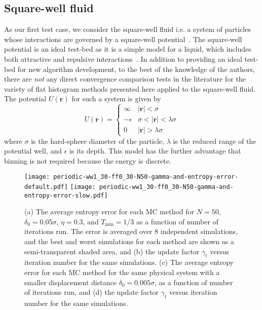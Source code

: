 \documentclass[letterpaper,twocolumn,amsmath,amssymb,pre,aps,10pt]{revtex4-1}
\begin{document}
\subsection{Square-well fluid}
As our first test case, we consider the square-well fluid i.e. a
system of particles whose interactions are governed by a square-well
potential~\cite{singh2003surface, barker2004perturbationSW}.  The
square-well potential is an ideal test-bed as it is a simple model for
a liquid, which includes both attractive and repulsive
interactions~\cite{barker1967-SW-perturbation, vega1992phase}.
In addition to providing an ideal test-bed for new algorithm development,
to the best of the knowledge of the authors, there are \emph{not} any direct convergence comparison tests in the literature for the variety of flat histogram methods presented here applied to the square-well fluid.
The
potential $U(\textbf{r})$ for such a system is given by
\begin{equation}
 U(\textbf{r})=\begin{cases} \infty &
 \lvert\textbf{r}\rvert< \sigma\\-\epsilon &
 \sigma<\lvert\textbf{r}\rvert<\lambda\sigma\\0 &
 \lvert\textbf{r}\rvert > \lambda\sigma\end{cases}
\end{equation}
where $\sigma$ is the hard-sphere diameter of the particle, $\lambda$ is the
reduced range of the potential well, and $\epsilon$ is its depth. This model has
the further advantage that binning is not required because the energy is
discrete.

\begin{figure*}
  \texttt{[image: periodic-ww1\_30-ff0\_30-N50-gamma-and-entropy-error-default.pdf]}%
\texttt{[image: periodic-ww1\_30-ff0\_30-N50-gamma-and-entropy-error-slow.pdf]}
  \caption{(a) The average entropy error for each MC method for $N=50$,
               $\delta_0 = 0.05\sigma$, $\eta = 0.3$, and $T_{\min} = 1/3$
               as a function of number of iterations run. The error is
               averaged over 8 independent simulations, and the best
               and worst simulations for each method are shown as a
               semi-transparent shaded area, and
           (b) the update factor $\gamma_t$ versus iteration number
               for the same simulations.
           (c) The average entropy error for each MC method for the
               same physical system with a smaller displacement distance
               $\delta_0 = 0.005\sigma$,
               as a function of number of iterations run, and
           (d) the update factor $\gamma_t$ versus iteration number
               for the same simulations.
  }\label{fig:fast-slow-gamma}
\end{figure*}
\end{document}
